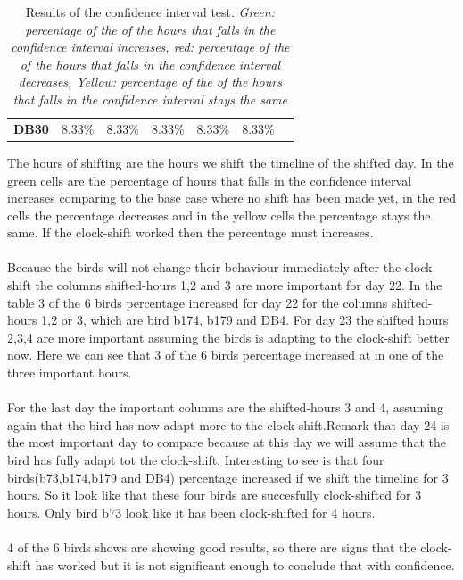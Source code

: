 \documentclass[a4paper]{article}
\begin{document}
\begin{table}[H]
{\begin{tabular}{|l|l|l|l|l|l|lllll}
\textbf{DB30} & \cellcolor[HTML]{BBDAFF}8.33\% & \cellcolor[HTML]{FFFE65}8.33\% & \cellcolor[HTML]{FFFE65}8.33\% & \cellcolor[HTML]{FFFE65}8.33\% & \cellcolor[HTML]{FFFE65}8.33\% & \multicolumn{5}{l}{\multirow{}{}{\cellcolor[HTML]{FFFFFF}}} \\ \cline{1-6}
\end{tabular}
}
\caption{Results of the confidence interval test. \small{\emph{Green: percentage of the of the hours that falls in the confidence interval increases, 
red: percentage of the of the hours that falls in the confidence interval decreases, Yellow: percentage of the of the hours that falls in the confidence interval stays the same }}}
\label{my-label}
\end{table}
The hours of shifting are the hours we shift the timeline of the shifted day. In the green cells are the percentage of hours that falls in the confidence interval increases comparing to the base case where no shift has been made yet, in the red cells the percentage decreases and in the yellow cells the percentage stays the same. If the clock-shift worked then the percentage must increases.\\\\
Because the birds will not change their behaviour immediately after the clock shift the columns shifted-hours 1,2 and 3 are more important for day 22. In the table 3 of the 6 birds percentage increased for day 22 for the columns shifted-hours 1,2 or 3, which are bird b174, b179 and DB4. For day 23 the shifted hours 2,3,4 are more important assuming the birds is adapting  to the clock-shift better now. Here we can see that 3 of the 6 birds percentage increased at in one of the three important hours.\\\\For the last day the important columns are the shifted-hours 3 and 4, assuming again that the bird has now adapt more to the clock-shift.Remark that day 24 is the most important day to compare because at this day we will assume that the bird has fully adapt tot the clock-shift. Interesting to see is that four birds(b73,b174,b179 and DB4) percentage increased if we shift the timeline for 3 hours. So it look like that these four birds are succesfully clock-shifted for 3 hours. Only bird b73 look like it has been clock-shifted for 4 hours.\\\\
4 of the 6 birds shows are showing good results, so there are signs that the clock-shift has worked but it is not significant enough to conclude that with confidence. 
\end{document}

